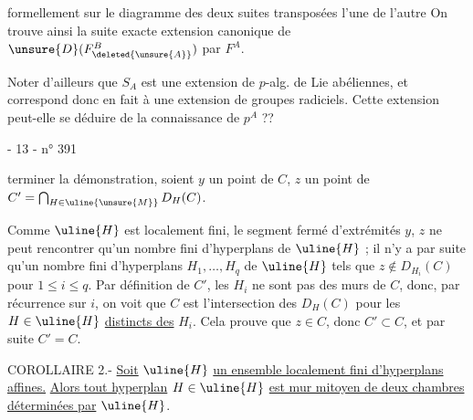 

formellement sur le diagramme des deux suites transposées l'une de l'autre
On trouve ainsi la suite exacte
extension canonique de $\unsure{D}(F_{\deleted{\unsure{A}}}^{B})$ par $F^A$.

Noter d'ailleurs que $S_A$ est une extension de $p$-alg. de Lie abéliennes, et correspond donc en fait à une extension de groupes radiciels. Cette extension peut-elle se déduire de la connaissance de $p^A$ ??



- 13 -
\hfill n° 391

terminer la démonstration, soient $y$ un point de $C$, $z$ un point de $C'=\bigcap_{H\in\uline{\unsure{M}}}D_H(C)$.

Comme $\uline{H}$ est localement fini, le segment fermé d'extrémités $y$, $z$ ne peut rencontrer qu'un nombre fini d'hyperplans de $\uline{H}$ ; il n'y a par suite qu'un nombre fini d'hyperplans $H_1,\ldots,H_q$ de $\uline{H}$ tels que $z\notin D_{H_i}(C)$ pour $1\leq i\leq q$. Par définition de $C'$, les $H_i$ ne sont pas des murs de $C$, donc, par récurrence sur $i$, on voit que $C$ est l'intersection des $D_H(C)$ pour les $H\in\uline{H}$ \uline{distincts des} $H_i$. Cela prouve que $z\in C$, donc $C'\subset C$, et par suite $C'=C$.

COROLLAIRE 2.- \uline{Soit} $\uline{H}$ \uline{un ensemble localement fini d'hyperplans affines.} \uline{Alors tout hyperplan} $H\in\uline{H}$ \uline{est mur mitoyen de deux chambres déterminées par} $\uline{H}$.

